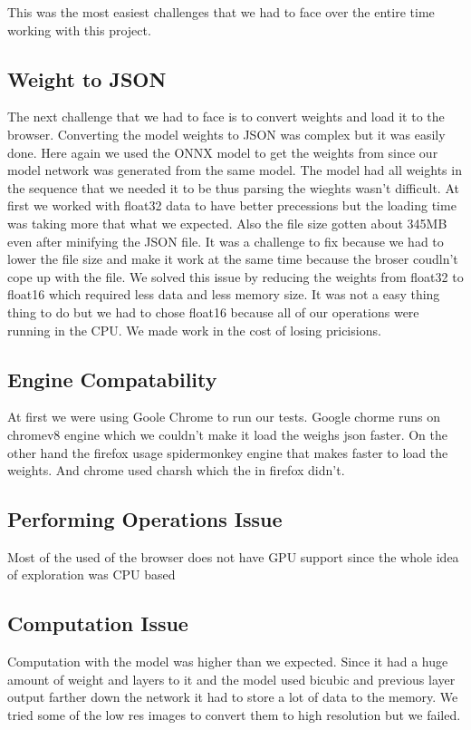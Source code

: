 \documentclass[a4paper,12pt]{article}
\begin{document}
This was the most easiest challenges that we had to face over the entire time working with this project.

\subsection{Weight to JSON}
The next challenge that we had to face is to convert weights and load it to the browser. Converting the model weights to JSON was complex but it was easily done. Here again we used the ONNX model to get the weights from since our model network was generated from the same model. The model had all weights in the sequence that we needed it to be thus parsing the wieghts wasn't difficult. At first we worked with float32 data to have better precessions but the loading time was taking more that what we expected. Also the file size gotten about 345MB even after minifying the JSON file. It was a challenge to fix because we had to lower the file size and make it work at the same time because the broser coudln't cope up with the file. We solved this issue by reducing the weights from float32 to float16 which required less data and less memory size. It was not a easy thing thing to do but we had to chose float16 because all of our operations were running in the CPU. We made work in the cost of losing pricisions.

\subsection{Engine Compatability}
At first we were using Goole Chrome to run our tests. Google chorme runs on chromev8 engine which we couldn't make it load the weighs json faster. On the other hand the firefox usage spidermonkey engine that makes faster to load the weights. And chrome used charsh which the in firefox didn't.

\subsection{Performing Operations Issue }
Most of the used of the browser does not have GPU support since the whole idea of exploration was CPU based

\subsection{Computation Issue}
Computation with the model was higher than we expected. Since it had a huge amount of weight and layers to it and the model used bicubic and previous layer output farther down the network it had to store a lot of data to the memory. We tried some of the low res images to convert them to high resolution but we failed. 
\end{document}
